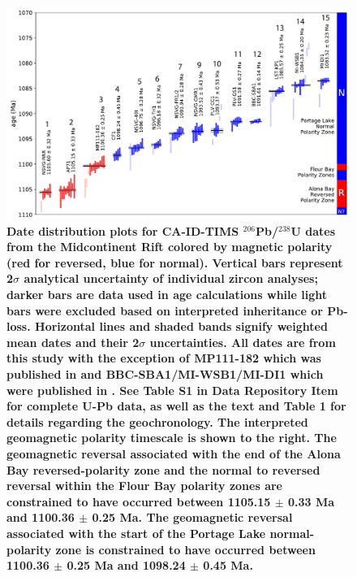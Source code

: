 \documentclass[11pt,letterpaper]{article}
\begin{document}
\begin{figure}
\centering
\includegraphics[width=6.5 in]{Figures/Fig2_MCR_dates.pdf}
\caption{\small{\textbf{Date distribution plots for CA-ID-TIMS $^{206}$Pb/$^{238}$U dates from the Midcontinent Rift colored by magnetic polarity (red for reversed, blue for normal). Vertical bars represent 2$\sigma$ analytical uncertainty of individual zircon analyses; darker bars are data used in age calculations while light bars were excluded based on interpreted inheritance or Pb-loss. Horizontal lines and shaded bands signify weighted mean dates and their 2$\sigma$ uncertainties. All dates are from this study with the exception of MP111-182 which was published in \cite{Swanson-Hysell2014a} and BBC-SBA1/MI-WSB1/MI-DI1 which were published in \cite{Fairchild2017a}. See Table S1 in Data Repository Item for complete U-Pb data, as well as the text and Table 1 for details regarding the geochronology. The interpreted geomagnetic polarity timescale is shown to the right. The geomagnetic reversal associated with the end of the Alona Bay reversed-polarity zone and the normal to reversed reversal within the Flour Bay polarity zones are constrained to have occurred between 1105.15 $\pm$ 0.33 Ma and 1100.36 $\pm$ 0.25 Ma. The geomagnetic reversal associated with the start of the Portage Lake normal-polarity zone is constrained to have occurred between 1100.36 $\pm$ 0.25 Ma and 1098.24 $\pm$ 0.45 Ma.}}}
\label{fig:geochron}
\end{figure}
\end{document}
